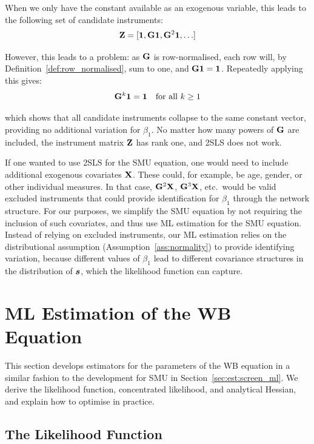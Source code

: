 When we only have the constant available as an exogenous variable, this leads to the following set of candidate instruments:
\begin{equation}
    \mathbf{Z} = [\bm{1}, \mathbf{G}\bm{1}, \mathbf{G}^2\bm{1}, \ldots]
\end{equation}

However, this leads to a problem: as $\mathbf{G}$ is row-normalised, each row will, by Definition~\ref{def:row_normalised}, sum to one, and $\mathbf{G}\bm{1} = \bm{1}$. Repeatedly applying this gives:
\begin{equation}
    \mathbf{G}^k\bm{1} = \bm{1} \quad \text{for all } k \geq 1
\end{equation}

which shows that all candidate instruments collapse to the same constant vector, providing no additional variation for $\beta_1$. No matter how many powers of $\mathbf{G}$ are included, the instrument matrix $\mathbf{Z}$ has rank one, and 2SLS does not work.

If one wanted to use 2SLS for the SMU equation, one would need to include additional exogenous covariates $\mathbf{X}$. These could, for example, be age, gender, or other individual measures. In that case, $\mathbf{G}^2\mathbf{X}$, $\mathbf{G}^3\mathbf{X}$, etc.\ would be valid excluded instruments that could provide identification for $\beta_1$ through the network structure. For our purposes, we simplify the SMU equation by not requiring the inclusion of such covariates, and thus use ML estimation for the SMU equation. Instead of relying on excluded instruments, our ML estimation relies on the distributional assumption (Assumption~\ref{ass:normality}) to provide identifying variation, because different values of $\beta_1$ lead to different covariance structures in the distribution of $\bm{s}$, which the likelihood function can capture.

\section{ML Estimation of the WB Equation}
\label{sec:est:wb_ml}
This section develops estimators for the parameters of the WB equation in a similar fashion to the development for SMU in Section~\ref{sec:est:screen_ml}. We derive the likelihood function, concentrated likelihood, and analytical Hessian, and explain how to optimise in practice.

\subsection{The Likelihood Function}

